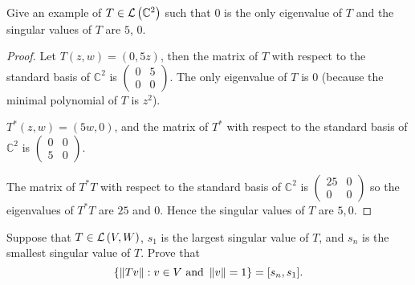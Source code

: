 \begin{exercise}
    Give an example of $T\in\mathcal{L}\left({\mathbb{C}^{2}}\right)$ such that $0$ is the only eigenvalue of $T$ and the singular values of $T$ are $5$, $0$.
\end{exercise}

\begin{proof}
    Let $T(z, w) = (0, 5z)$, then the matrix of $T$ with respect to the standard basis of $\mathbb{C}^{2}$ is $\begin{pmatrix}0 & 5 \\ 0 & 0 \end{pmatrix}$. The only eigenvalue of $T$ is $0$ (because the minimal polynomial of $T$ is $z^{2}$).

    $T^{*}(z, w) = (5w, 0)$, and the matrix of $T^{*}$ with respect to the standard basis of $\mathbb{C}^{2}$ is $\begin{pmatrix}0 & 0 \\ 5 & 0\end{pmatrix}$.

    The matrix of $T^{*}T$ with respect to the standard basis of $\mathbb{C}^{2}$ is $\begin{pmatrix}25 & 0 \\ 0 & 0\end{pmatrix}$ so the eigenvalues of $T^{*}T$ are $25$ and $0$. Hence the singular values of $T$ are $5, 0$.
\end{proof}
\newpage

\begin{exercise}\label{chapter7:sectionE:exercise4}
    Suppose that $T\in\mathcal{L}\left({V, W}\right)$, $s_{1}$ is the largest singular value of $T$, and $s_{n}$ is the smallest singular value of $T$. Prove that
    \[
        \left\{ \left\Vert{Tv}\right\Vert: v\in V\text{ and }\left\Vert{v}\right\Vert = 1\right\} = [s_{n}, s_{1}].
    \]
\end{exercise}

